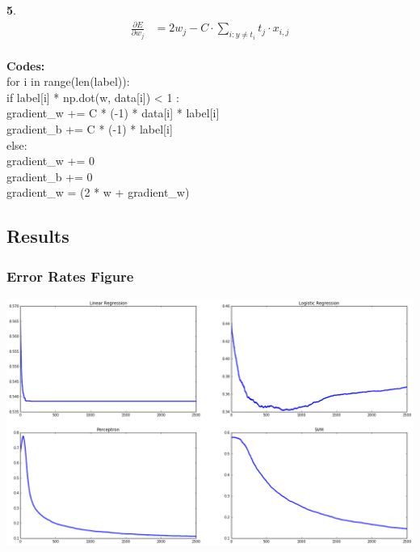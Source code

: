 \documentclass{article}
\begin{document}
\vspace{10pt}
\textbf5.\\
\[\begin{aligned}
\frac{\partial E}{\partial w_j} &= 2w_j-C\cdot \sum_{i: y\neq t_i}t_j\cdot x_{i, j}
\end{aligned}
\]
\\\textbf{Codes: }
\\for i in range(len(label)):
\\if label[i] * np.dot(w, data[i]) < 1 :
\\gradient\_w += C * (-1) * data[i] * label[i]
\\gradient\_b += C * (-1) * label[i]
\\else:
\\gradient\_w += 0
\\gradient\_b += 0
\\gradient\_w = (2 * w + gradient\_w) 


\subsection{Results}

\subsubsection{Error Rates Figure}
\includegraphics[width = .8\textwidth]{python1.png}
\end{document}
